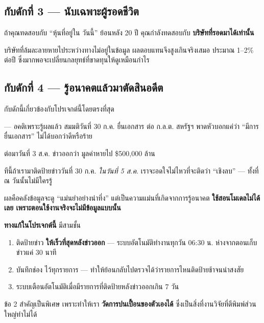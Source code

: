 \documentclass[11pt]{article}
\begin{document}
\subsection{กับดักที่ 3 --- นับเฉพาะผู้รอดชีวิต}

\begin{trap}{}
ถ้าคุณทดสอบกับ ``หุ้นที่อยู่ใน  วันนี้'' ย้อนหลัง 20 ปี
คุณกำลังทดสอบกับ \textbf{บริษัทที่รอดมาได้เท่านั้น}

บริษัทที่ล้มละลายหายไประหว่างทางไม่อยู่ในข้อมูล ผลตอบแทนจึงสูงเกินจริงเสมอ
ประมาณ 1--2\% ต่อปี ซึ่งมากพอจะเปลี่ยนกลยุทธ์ที่ขาดทุนให้ดูเหมือนกำไร
\end{trap}

\subsection{กับดักที่ 4 --- รู้อนาคตแล้วมาตัดสินอดีต}

กับดักนี้เกี่ยวข้องกับโปรเจกต์นี้โดยตรงที่สุด

\begin{trap}{ --- อคติเพราะรู้ผลแล้ว}
สมมติวันที่ 30 ก.ค.  ยื่นเอกสาร  ต่อ ก.ล.ต. สหรัฐฯ
พาดหัวบอกแค่ว่า ``มีการยื่นเอกสาร'' ไม่ได้บอกว่าดีหรือร้าย

ต่อมาวันที่ 3 ส.ค. ข่าวออกว่า  มูลค่าหายไป \$500{,}000 ล้าน

\vspace{0.5em}
ทีนี้ถ้าเรามาติดป้ายข่าววันที่ 30 ก.ค. \emph{ในวันที่ 5 ส.ค.}
เราจะอดใจไม่ไหวที่จะติดว่า ``เชิงลบ'' --- ทั้งที่ ณ วันนั้นไม่มีใครรู้

ผลคือคลังข้อมูลจะดู ``แม่นยำอย่างน่าทึ่ง'' แต่เป็นความแม่นที่เกิดจากการรู้อนาคต
\textbf{ใช้สอนโมเดลไม่ได้เลย เพราะตอนใช้งานจริงจะไม่มีข้อมูลแบบนั้น}
\end{trap}

\begin{keypoint}
\textbf{ทางแก้ในโปรเจกต์นี้} มีสามชั้น

\begin{enumerate}
\item ติดป้ายข่าว \textbf{ให้เร็วที่สุดหลังข่าวออก} --- ระบบอัตโนมัติทำงานทุกวัน 06:30 น.
      ห่างจากตอนเก็บข่าวแค่ 30 นาที
\item บันทึกช่อง  ไว้ทุกรายการ
      --- ทำให้ย้อนกลับไปตรวจได้ว่ารายการไหนติดป้ายช้าจนน่าสงสัย
\item ระบบเตือนอัตโนมัติเมื่อมีรายการที่ติดป้ายหลังข่าวออกเกิน 7 วัน
\end{enumerate}

ข้อ 2 สำคัญเป็นพิเศษ เพราะทำให้เรา \textbf{วัดการปนเปื้อนของตัวเองได้}
ซึ่งเป็นสิ่งที่งานวิจัยที่ตีพิมพ์ส่วนใหญ่ทำไม่ได้
\end{keypoint}
\end{document}
